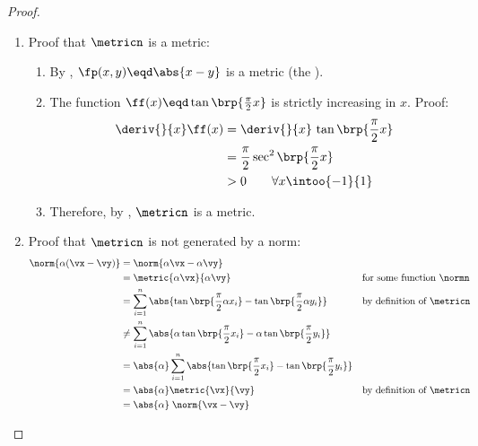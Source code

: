 {\begin{proof}
\begin{enumerate}
  \item Proof that $\metricn$ is a metric:
    \begin{enumerate}
      \item By , $\fp(x,y)\eqd \abs{x-y}$ is a metric (the ). 
      \item The function $\ff(x)\eqd \tan\brp{\frac{\pi}{2}x}$ is strictly increasing in $x$. Proof:
        \begin{align*}
          \deriv{}{x} \ff(x)
            &= \deriv{}{x}\, \tan\brp{\frac{\pi}{2}x}
          \\&= \frac{\pi}{2} \sec^2\brp{\frac{\pi}{2}x}
          \\&> 0 \qquad \forall x\intoo{-1}{1}
        \end{align*}
      \item Therefore, by , $\metricn$ is a metric.
    \end{enumerate}

  \item Proof that $\metricn$ is not generated by a norm:
    \begin{align*}
      \norm{\alpha(\vx-\vy)}
        &= \norm{\alpha\vx-\alpha\vy}
      \\&= \metric{\alpha\vx}{\alpha\vy}
        && \text{for some function $\normn$}
      \\&= \sum_{i=1}^n  \abs{\tan\brp{\frac{\pi}{2}\alpha x_i} - \tan\brp{\frac{\pi}{2} \alpha y_i}}
        && \text{by definition of $\metricn$}
      \\&\ne  \sum_{i=1}^n \abs{\alpha\tan\brp{\frac{\pi}{2}x_i} - \alpha\tan\brp{\frac{\pi}{2} y_i}}
      \\&= \abs{\alpha} \sum_{i=1}^n \abs{\tan\brp{\frac{\pi}{2}x_i} - \tan\brp{\frac{\pi}{2} y_i}}
      \\&= \abs{\alpha} \metric{\vx}{\vy}
        && \text{by definition of $\metricn$}
      \\&= \abs{\alpha}\;\norm{\vx-\vy}
    \end{align*}


\end{enumerate}
\end{proof}}
